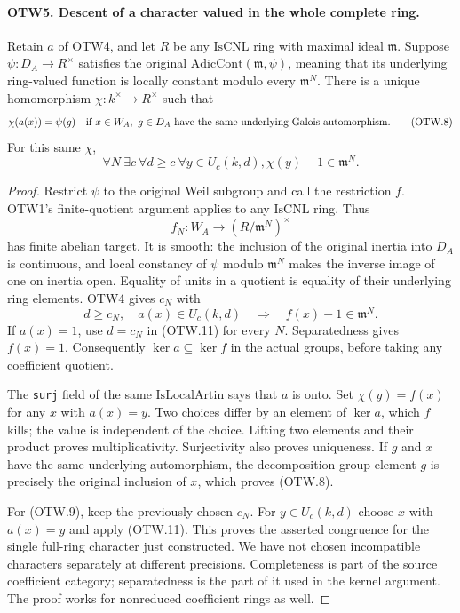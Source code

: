 \paragraph{OTW5. Descent of a character valued in the whole complete ring.}
\label{claim:OTW5}
Retain $a$ of OTW4, and let $R$ be any $\mathrm{IsCNL}$ ring with
maximal ideal $\mathfrak m$.  Suppose
$\psi:D_A\to R^\times$ satisfies the original
$\mathrm{AdicCont}(\mathfrak m,\psi)$, meaning that its underlying
ring-valued function is locally constant modulo every
$\mathfrak m^N$.  There is a unique homomorphism
$\chi:k^\times\to R^\times$ such that
\[
 \chi(a(x))=\psi(g)
 \quad\hbox{if }x\in W_A,\ g\in D_A
       \hbox{ have the same underlying Galois automorphism}.
 \tag{OTW.8}
\]
For this same $\chi$,
\[
 \forall N\ \exists c\ \forall d\geq c\ \forall y\in U_c(k,d),
                       \chi(y)-1\in\mathfrak m^N.
                       \tag{OTW.9}
\]
\begin{proof}
Restrict $\psi$ to the original Weil subgroup and call the restriction
$f$.  OTW1's finite-quotient argument applies to any $\mathrm{IsCNL}$
ring.  Thus
\[
 f_N:W_A\longrightarrow(R/\mathfrak m^N)^\times
 \tag{OTW.10}
\]
has finite abelian target.  It is smooth: the inclusion of the
original inertia into $D_A$ is continuous, and local constancy of
$\psi$ modulo $\mathfrak m^N$ makes the inverse image of one on
inertia open.  Equality of units in a quotient is equality of their
underlying ring elements.  OTW4 gives $c_N$ with
\[
 d\geq c_N,\quad a(x)\in U_c(k,d)
               \quad\Longrightarrow\quad f(x)-1\in\mathfrak m^N.
               \tag{OTW.11}
\]
If $a(x)=1$, use $d=c_N$ in (OTW.11) for every $N$.
Separatedness gives $f(x)=1$.  Consequently
$\ker a\subseteq\ker f$ in the actual groups, before taking
any coefficient quotient.

The \texttt{surj} field of the same $\mathrm{IsLocalArtin}$ says
that $a$ is onto.  Set $\chi(y)=f(x)$ for any $x$ with $a(x)=y$.
Two choices differ by an element of $\ker a$, which $f$ kills;
the value is independent of the choice.  Lifting two elements and
their product proves multiplicativity.  Surjectivity also proves
uniqueness.  If $g$ and $x$ have the same underlying automorphism,
the decomposition-group element $g$ is precisely the original
inclusion of $x$, which proves (OTW.8).

For (OTW.9), keep the previously chosen $c_N$.  For
$y\in U_c(k,d)$ choose $x$ with $a(x)=y$ and apply (OTW.11).
This proves the asserted congruence for the single full-ring
character just constructed.  We have not chosen incompatible
characters separately at different precisions.  Completeness is
part of the source coefficient category; separatedness is the part
of it used in the kernel argument.  The proof works for nonreduced
coefficient rings as well.
\end{proof}

